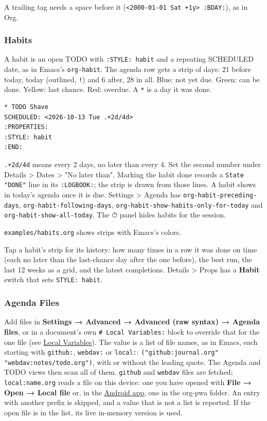 \documentclass[11pt]{article}
\begin{document}
A trailing tag needs a space before it (\texttt{<2000-01-01 Sat +1y> :BDAY:}), as in Org.

\subsubsection{Habits}
\label{sec:org2625440}
A habit is an open TODO with \texttt{:STYLE: habit} and a repeating SCHEDULED date, as in Emacs's \texttt{org-habit}. The agenda row gets a strip of days: 21 before today, today (outlined, \texttt{!}) and 6 after, 28 in all. Blue: not yet due. Green: can be done. Yellow: last chance. Red: overdue. A \texttt{*} is a day it was done.

\begin{verbatim}
* TODO Shave
SCHEDULED: <2026-10-13 Tue .+2d/4d>
:PROPERTIES:
:STYLE: habit
:END:
\end{verbatim}

\texttt{.+2d/4d} means every 2 days, no later than every 4. Set the second number under Details > Dates > "No later than". Marking the habit done records a \texttt{State "DONE"} line in its \texttt{:LOGBOOK:}; the strip is drawn from those lines. A habit shows in today's agenda once it is due. Settings > Agenda has \texttt{org-habit-preceding-days}, \texttt{org-habit-following-days}, \texttt{org-habit-show-habits-only-for-today} and \texttt{org-habit-show-all-today}. The ⏱ panel hides habits for the session.

\texttt{examples/habits.org} shows strips with Emacs's colors.

Tap a habit's strip for its history: how many times in a row it was done on time (each no later than the last-chance day after the one before), the best run, the last 12 weeks as a grid, and the latest completions. Details > Props has a \textbf{Habit} switch that sets \texttt{STYLE: habit}.

\subsubsection{Agenda Files}
\label{sec:org4d24003}
Add files in \textbf{Settings → Advanced → Advanced (raw syntax) → Agenda files}, or in a document's own \texttt{\# Local Variables:} block to override that for the one file (see \hyperref[sec:org761a631]{Local Variables}). The value is a list of file names, as in Emacs, each starting with \texttt{github:}, \texttt{webdav:} or \texttt{local:}: \texttt{("github:journal.org" "webdav:notes/todo.org")}, with or without the leading quote. The Agenda and TODO views then scan all of them. \texttt{github} and \texttt{webdav} files are fetched; \texttt{local:name.org} reads a file on this device: one you have opened with \textbf{File → Open → Local file} or, in the \hyperref[sec:org5b8e0d4]{Android app}, one in the org-pwa folder. An entry with another prefix is skipped, and a value that is not a list is reported. If the open file is in the list, its live in-memory version is used.
\end{document}
